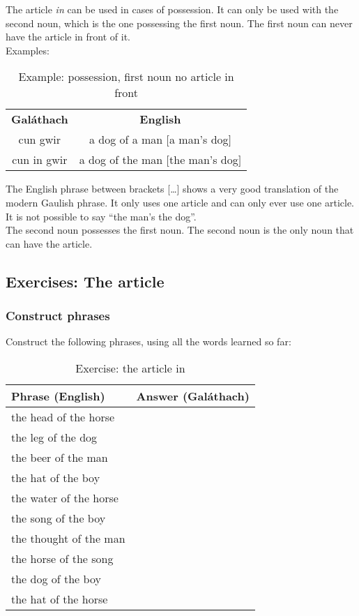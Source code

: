 The article \textit{in} can be used in cases of possession. It can only be used with the second noun, which is the one possessing the first noun. The first noun can never have the article in front of it.\\

Examples:
\begin{table}[H]
\centering
\begin{tabular}{cc}
  \toprule
  \textbf{Gal\'{a}thach} & \textbf{English}\\
  \cmidrule(lr){1-1}\cmidrule(lr){2-2}
  cun gwir & a dog of a man $[$a man's dog$]$\\
  cun in gwir & a dog of the man $[$the man's dog$]$\\
  \bottomrule
\end{tabular}
\caption{Example: possession, first noun no article in front}
\label{example_possession_first_noun_no_article_in_front}
\end{table}

The English phrase between brackets [\dots] shows a very good translation of the modern Gaulish phrase. It only uses one article and can only ever use one article. It is not possible to say ``the man's the dog''.\\

The second noun possesses the first noun. The second noun is the only noun that can have the article.

\newpage
\subsection{Exercises: The article}

\subsubsection{Construct phrases}

Construct the following phrases, using all the words learned so far:
\begin{table}[H]
\centering
\begin{tabular}{|l|M{10.0cm}|}
  \toprule
  \textbf{Phrase (English)} & \textbf{Answer (Gal\'{a}thach)}\\
  \toprule
  the head of the horse & \\
  \midrule
  the leg of the dog & \\
  \midrule
  the beer of the man & \\
  \midrule
  the hat of the boy & \\
  \midrule
  the water of the horse & \\
  \midrule
  the song of the boy & \\
  \midrule
  the thought of the man & \\
  \midrule
  the horse of the song & \\
  \midrule
  the dog of the boy & \\
  \midrule
  the hat of the horse & \\
  \bottomrule
\end{tabular}
\caption{Exercise: the article in}
\label{exercise_article_in}
\end{table}

